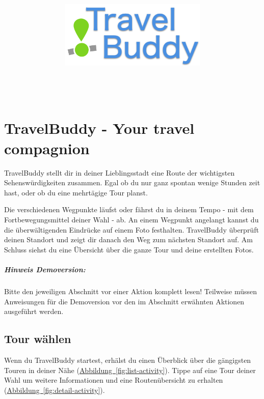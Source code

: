 \documentclass[a4paper,10pt,xetex]{article}
\title{
  \includegraphics[width=7cm]{travel-buddy_white}\\[\bigskipamount]
  \documenttitle\\[\bigskipamount]
}
\author{\documentauthors}
\date{\parbox{\linewidth}{\centering%
  IT15TA ZH \hspace*{3cm} Gruppe 3\endgraf\bigskip
  Dokumentversion \documentversion, \documentdate\endgraf
}}
\begin{document}

\maketitle\newpage

%

\section{TravelBuddy - Your travel compagnion}

TravelBuddy stellt dir in deiner Lieblingsstadt eine Route der wichtigsten Sehenswürdigkeiten
zusammen. Egal ob du nur ganz spontan wenige Stunden zeit hast, oder ob du eine mehrtägige
Tour planst.

Die verschiedenen Wegpunkte läufst oder fährst du in deinem Tempo - mit dem Fortbewegungsmittel
deiner Wahl - ab. An einem Wegpunkt angelangt kannst du die überwältigenden Eindrücke auf
einem Foto festhalten. TravelBuddy überprüft deinen Standort und zeigt dir danach den Weg
zum nächsten Standort auf. Am Schluss siehst du eine Übersicht über die ganze Tour und
deine erstellten Fotos.

\subparagraph{Hinweis Demoversion:}
Bitte den jeweiligen Abschnitt vor einer Aktion komplett lesen! Teilweise müssen
Anweisungen für die Demoversion vor den im Abschnitt erwähnten Aktionen ausgeführt werden.

\subsection{Tour wählen}
Wenn du TravelBuddy startest, erhälst du einen Überblick über die gängigsten Touren in
deiner Nähe (\hyperref[fig:list-activity]{Abbildung~\ref*{fig:list-activity}}).
Tippe auf eine Tour deiner Wahl um weitere Informationen und eine
Routenübersicht zu erhalten (\hyperref[fig:detail-activity]{Abbildung~\ref*{fig:detail-activity}}).
\end{document}
